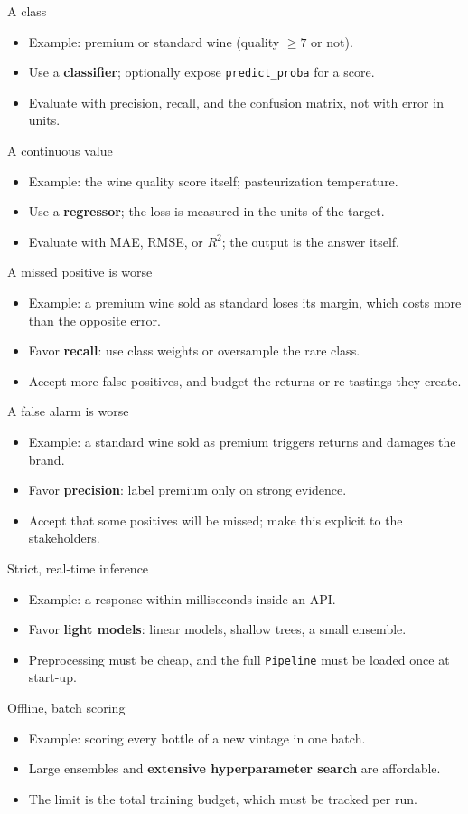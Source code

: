 {A class}
{\begin{itemize}
\item Example: premium or standard wine (quality $\ge 7$ or not).
\item Use a \textbf{classifier}; optionally expose \texttt{predict\_proba} for a score.
\item Evaluate with precision, recall, and the confusion matrix, not with error in units.
\end{itemize}}
{A continuous value}
{\begin{itemize}
\item Example: the wine quality score itself; pasteurization temperature.
\item Use a \textbf{regressor}; the loss is measured in the units of the target.
\item Evaluate with MAE, RMSE, or $R^2$; the output is the answer itself.
\end{itemize}}

{A missed positive is worse}
{\begin{itemize}
\item Example: a premium wine sold as standard loses its margin, which costs more than the opposite error.
\item Favor \textbf{recall}: use class weights or oversample the rare class.
\item Accept more false positives, and budget the returns or re-tastings they create.
\end{itemize}}
{A false alarm is worse}
{\begin{itemize}
\item Example: a standard wine sold as premium triggers returns and damages the brand.
\item Favor \textbf{precision}: label premium only on strong evidence.
\item Accept that some positives will be missed; make this explicit to the stakeholders.
\end{itemize}}

{Strict, real-time inference}
{\begin{itemize}
\item Example: a response within milliseconds inside an API.
\item Favor \textbf{light models}: linear models, shallow trees, a small ensemble.
\item Preprocessing must be cheap, and the full \texttt{Pipeline} must be loaded once at start-up.
\end{itemize}}
{Offline, batch scoring}
{\begin{itemize}
\item Example: scoring every bottle of a new vintage in one batch.
\item Large ensembles and \textbf{extensive hyperparameter search} are affordable.
\item The limit is the total training budget, which must be tracked per run.
\end{itemize}}

